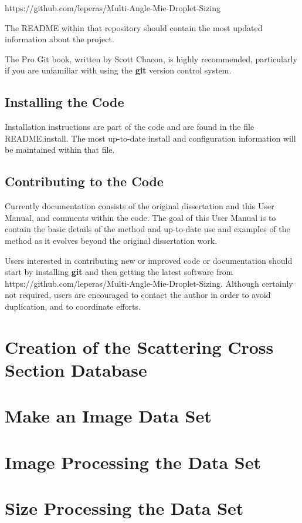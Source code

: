 https://github.com/leperas/Multi-Angle-Mie-Droplet-Sizing

The README within that repository should contain the most updated information about the project.

The Pro Git book, written by Scott Chacon, is highly recommended, particularly if you are unfamiliar with using the \textbf{git} version control system.

\subsection{Installing the Code}
Installation instructions are part of the code and are found in the file README.install.  The most up-to-date install and configuration information will be maintained within that file.

\subsection{Contributing to the Code}
Currently documentation consists of the original dissertation and this User Manual, and comments within the code. The goal of this User Manual is to contain the basic details of the method and up-to-date use and examples of the method as it evolves beyond the original dissertation work.

Users interested in contributing new or improved code or documentation should start by installing \textbf{git} and then getting the latest software from https://github.com/leperas/Multi-Angle-Mie-Droplet-Sizing.  Although certainly not required, users are encouraged to contact the author in order to avoid duplication, and to coordinate efforts.  

\section{Creation of the Scattering Cross Section Database}



\section{Make an Image Data Set}



\section{Image Processing the Data Set}



\section{Size Processing the Data Set}


